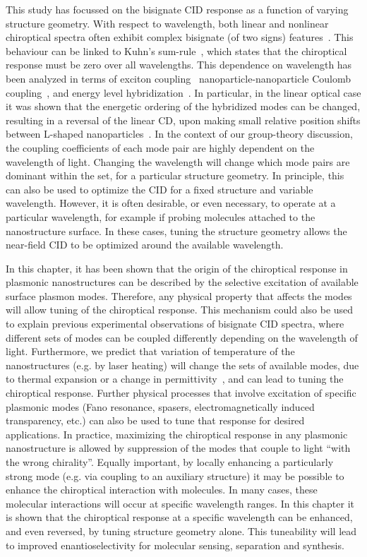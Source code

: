 This study has focussed on the bisignate CID response as a function of varying structure geometry. With respect to wavelength, both linear and nonlinear chiroptical spectra often exhibit complex bisignate (of two signs) features~\cite{Li2015, Lee2013, Decker2007, Droulias2013, Plum2009}. This behaviour can be linked to Kuhn's sum-rule~\cite{Kuhn1930}, which states that the chiroptical response must be zero over all wavelengths. This dependence on wavelength has been analyzed in terms of exciton coupling~\cite{Guerrero-Martinez2011} nanoparticle-nanoparticle Coulomb coupling~\cite{Fan2010}, and energy level hybridization~\cite{Auguie2011a}.
In particular, in the linear optical case it was shown that the energetic ordering of the hybridized modes can be changed, resulting in a reversal of the linear CD, upon making small relative position shifts between L-shaped nanoparticles~\cite{Hentschel2015}.
In the context of our group-theory discussion, the coupling coefficients of each mode pair are highly dependent on the wavelength of light. Changing the wavelength will change which mode pairs are dominant within the set, for a particular structure geometry. In principle, this can also be used to optimize the CID for a fixed structure and variable wavelength. However, it is often desirable, or even necessary, to operate at a particular wavelength, for example if probing molecules attached to the nanostructure surface. In these cases, tuning the structure geometry allows the near-field CID to be optimized around the available wavelength.

In this chapter, it has been shown that the origin of the chiroptical response in plasmonic nanostructures can be described by the selective excitation of available surface plasmon modes. Therefore, any physical property that affects the modes will allow tuning of the chiroptical response. This mechanism could also be used to explain previous experimental observations of bisignate CID spectra, where different sets of modes can be coupled differently depending on the wavelength of light. Furthermore, we predict that variation of temperature of the nanostructures (e.g. by laser heating) will change the sets of available modes, due to thermal expansion or a change in permittivity~\cite{Aksyutov1977}, and can lead to tuning the chiroptical response. Further physical processes that involve excitation of specific plasmonic modes (Fano resonance, spasers, electromagnetically induced transparency, etc.) can also be used to tune that response for desired applications. 
In practice, maximizing the chiroptical response in any plasmonic nanostructure is allowed by suppression of the modes that couple to light ``with the wrong chirality''. Equally important, by locally enhancing a particularly strong mode (e.g. via coupling to an auxiliary structure) it may be possible to enhance the chiroptical interaction with molecules. In many cases, these molecular interactions will occur at specific wavelength ranges. In this chapter it is shown that the chiroptical response at a specific wavelength can be enhanced, and even reversed, by tuning structure geometry alone. This tuneability will lead to improved enantioselectivity for molecular sensing, separation and synthesis.
